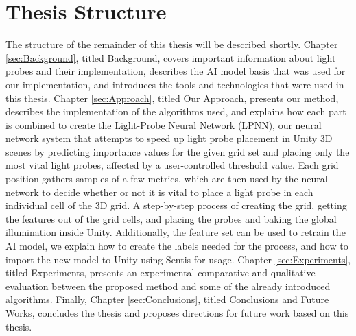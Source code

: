 \section{Thesis Structure} %
The structure of the remainder of this thesis will be described shortly. Chapter \ref{sec:Background}, titled Background, covers important information about light probes and their implementation, describes the AI model basis that was used for our implementation, and introduces the tools and technologies that were used in this thesis. Chapter \ref{sec:Approach}, titled Our Approach, presents our method, describes the implementation of the algorithms used, and explains how each part is combined to create the Light-Probe Neural Network (LPNN), our neural network system that attempts to speed up light probe placement in Unity 3D scenes by predicting importance values for the given grid set and placing only the most vital light probes, affected by a user-controlled threshold value. Each grid position gathers samples of a few metrics, which are then used by the neural network to decide whether or not it is vital to place a light probe in each individual cell of the 3D grid. A step-by-step process of creating the grid, getting the features out of the grid cells, and placing the probes and baking the global illumination inside Unity. Additionally, the feature set can be used to retrain the AI model, we explain how to create the labels needed for the process, and how to import the new model to Unity using Sentis for usage. Chapter \ref{sec:Experiments}, titled Experiments, presents an experimental comparative and qualitative evaluation between the proposed method and some of the already introduced algorithms. Finally, Chapter \ref{sec:Conclusions}, titled Conclusions and Future Works, concludes the thesis and proposes directions for future work based on this thesis.













